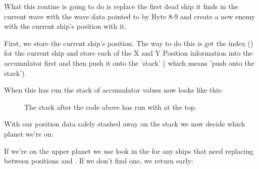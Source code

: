 What this routine is going to do is replace the first dead ship it finds in the current wave with the wave data pointed to by  Byte 8-9
and create a new enemy with the current ship's position with it.

First, we store the current ship's position. The way to do this is get the index () for the current ship  and store
each of the X and Y Position information into the accumulator first  and then push it onto the 'stack' ( which means
'push  onto the stack').

%


When this has run the stack of accumulator values now looks like this:

\begin{figure}[H]
  {
    \setlength{\tabcolsep}{3.0pt}
    \setlength\cmidrulewidth{\heavyrulewidth} %
    \begin{adjustbox}{width=10cm,center}
    \end{adjustbox}

  }\caption*{The stack after the code above has run with  at the top.}
\end{figure}

With our position data safely stashed away on the stack we now decide which planet we're on:

%


If we're on the upper planet we use  look in the  for any ships that
need replacing between positions  and . If we don't find one, we return early:

%


